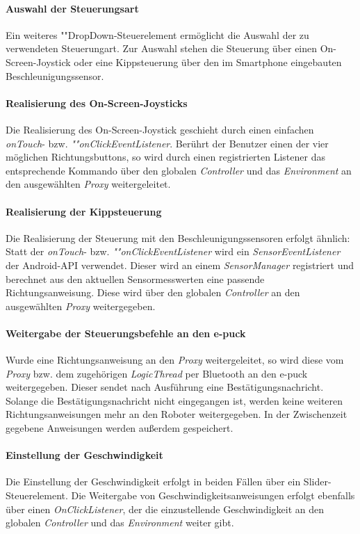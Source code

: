 \documentclass[10pt,a4paper]{article}
\begin{document}
	\paragraph*{Auswahl der Steuerungsart} Ein weiteres ""Drop\-Down-Steu\-er\-ele\-ment ermöglicht die Auswahl der zu verwendeten Steuerungart. Zur
	Auswahl stehen die Steuerung über einen On-Screen-Joystick oder eine Kippsteuerung über den im Smartphone eingebauten Beschleunigungssensor.
	
	\paragraph*{Realisierung des On-Screen-Joysticks} Die Realisierung des On-Screen-Joystick geschieht durch einen einfachen \textit{onTouch}- bzw.
	\textit{""on\-Click\-E\-vent\-List\-e\-ner}. Berührt der Benutzer einen der vier möglichen Richtungsbuttons, so wird durch einen registrierten
	Listener das entsprechende Kommando über den globalen \textit{Controller} und das \textit{Environment} an den ausgewählten \textit{Proxy}
	weitergeleitet.
	
	\paragraph*{Realisierung der Kippsteuerung} Die Realisierung der Steuerung mit den Beschleunigungssensoren erfolgt ähnlich: Statt der 
	\textit{onTouch}- bzw. \textit{""on\-Click\-E\-vent\-List\-e\-ner} wird ein \textit{SensorEventListener} der Android-API verwendet. Dieser wird
	an einem \textit{SensorManager} registriert und berechnet aus den aktuellen Sensormesswerten eine passende Richtungsanweisung. Diese wird über
	den globalen \textit{Controller} an den ausgewählten \textit{Proxy} weitergegeben.
	
	\paragraph*{Weitergabe der Steuerungsbefehle an den e-puck} Wurde eine Richtungsanweisung an den \textit{Proxy} weitergeleitet, so wird diese vom
	\textit{Proxy} bzw. dem zugehörigen \textit{LogicThread} per Bluetooth an den e-puck weitergegeben. Dieser sendet nach Ausführung eine
	Bestätigungsnachricht.
	Solange die Bestätigungsnachricht nicht eingegangen ist, werden keine weiteren Richtungsanweisungen mehr an den Roboter weitergegeben. In der 
	Zwischenzeit gegebene Anweisungen werden außerdem gespeichert.
	
	\paragraph*{Einstellung der Geschwindigkeit} Die Einstellung der Geschwindigkeit erfolgt in beiden Fällen über ein Slider-Steuerelement. Die
	Weitergabe von Geschwindigkeitsanweisungen erfolgt ebenfalls über einen \textit{OnClickListener}, der die einzustellende Geschwindigkeit an den
	globalen \textit{Controller} und das \textit{Environment} weiter gibt.
	
\end{document}
